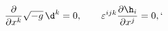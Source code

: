 \begin{equation}
\frac{\partial }{\partial x^k}\sqrt{-g}\,{\d}^k=0,\qquad 
{\varepsilon}^{ijk}\frac{\partial {\h}_i}{\partial x^j}=0,
\label{s2}`
\end{equation}

